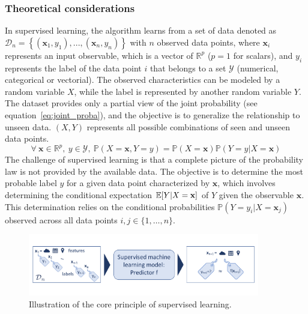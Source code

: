 \documentclass[main]{subfiles}
\begin{document}
\subsubsection{Theoretical considerations}

In supervised learning, the algorithm learns from a set of data denoted as $\mathcal{D}_{n}=\left\{(\mathbf{x}_{1},y_{1}),...,(\mathbf{x}_{n},y_{n})\right\}$ with $n$ observed data points, where $\mathbf{x}_{i}$ represents an input observable, which is a vector of $\mathbb{R}^{p}$ ($p=1$ for scalars), and $y_{i}$ represents the label of the data point $i$ that belongs to a set $\mathcal{Y}$ (numerical, categorical or vectorial). 
The observed characteristics can be modeled by a random variable $X$, while the label is represented by another random variable $Y$. The dataset provides only a partial view of the joint probability (see equation~\ref{eq:joint_proba}), and the objective is to generalize the relationship to unseen data. $(X,Y)$ represents all possible combinations of seen and unseen data points.
\begin{equation}\label{eq:joint_proba}
  \forall\ \mathbf{x}\in\mathbb{R}^{p},\ y\in\mathcal{Y},\ \mathbb{P}\left(X=\mathbf{x}, Y=y\right) = \mathbb{P}(X=\mathbf{x})\mathbb{P}(Y=y|X=\mathbf{x})
\end{equation}
The challenge of supervised learning is that a complete picture of the probability law is not provided by the available data. The objective is to determine the most probable label $y$ for a given data point characterized by $\mathbf{x}$, which involves determining the conditional expectation $\mathbb{E}{\left[Y|X=\mathbf{x}\right]}$ of $Y$ given the observable $\mathbf{x}$. This determination relies on the conditional probabilities $\mathbb{P}(Y=y_i|X=\mathbf{x}_j)$ observed across all data points $i,j\in\{1,\ldots,n\}$.

\begin{figure}[ht]
  \centering
    \includegraphics[width=0.9\textwidth]{figures/4-ml/machine learning.pdf}
    \caption{Illustration of the core principle of supervised learning.}\label{fgr:supervised_leaning}
\end{figure}
\end{document}
